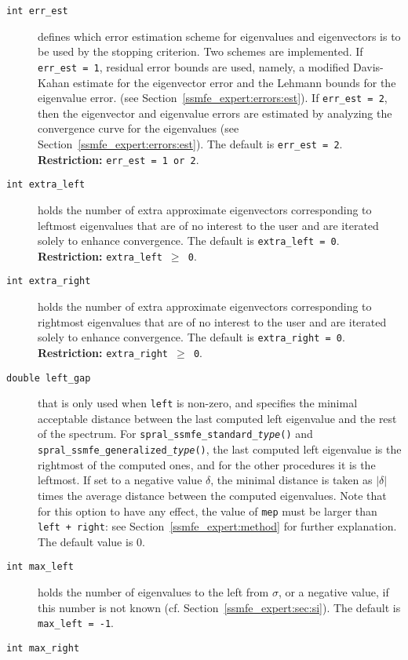 \begin{description}
%
\item[\texttt{int err\_est}] 
defines which error estimation scheme 
for eigenvalues and eigenvectors
is to be used by the stopping criterion.
Two schemes are implemented.
If {\tt err\_est = 1}, residual error bounds are used,
namely,
a modified Davis-Kahan estimate for the eigenvector error
and
the Lehmann bounds for the eigenvalue error.
(see Section~\ref{ssmfe_expert:errors:est}).
If {\tt err\_est = 2}, 
then the eigenvector and eigenvalue errors
are estimated by analyzing the convergence curve
for the eigenvalues (see Section~\ref{ssmfe_expert:errors:est}).
The default is {\tt err\_est = 2}.
{\bf Restriction:} {\tt err\_est = 1 {\rm or} 2}.
%
\item[\texttt{int extra\_left}]
holds the number of extra approximate eigenvectors
corresponding to leftmost eigenvalues
that are of no interest to the user
and are iterated solely to enhance convergence.
The default is {\tt extra\_left = 0}.
{\bf Restriction:} {\tt extra\_left $\ge$ 0}.
%
\item[\texttt{int extra\_right}]
holds the number of extra approximate eigenvectors
corresponding to rightmost eigenvalues
that are of no interest to the user
and are iterated solely to enhance convergence.
The default is {\tt extra\_right = 0}.
{\bf Restriction:} {\tt extra\_right $\ge$ 0}.
%
\item[\texttt{double left\_gap}]
that is only used when
{\tt left} is non-zero, and
specifies the minimal acceptable distance
between the last computed left eigenvalue
and the rest of the spectrum.
For {\tt spral\_ssmfe\_standard\_\textit{type}()} and {\tt spral\_ssmfe\_generalized\_\textit{type}()},
the last computed left eigenvalue
is the rightmost of the computed ones,
and for the other procedures
it is the leftmost.
If set to a negative value $\delta$,
the minimal distance is taken as
$|\delta|$ times the average distance between the computed eigenvalues.
Note that for this option to have any effect,
the value of {\tt mep} must be larger than
{\tt left + right}: see Section~\ref{ssmfe_expert:method}
for further explanation.
The default value is 0.
%
\item[\texttt{int max\_left}]
holds the number of eigenvalues to the left from $\sigma$,
or a negative value, if this number is not known
(cf. Section~\ref{ssmfe_expert:sec:si}).
The default is {\tt max\_left = -1}.
%
\item[\texttt{int max\_right}]

\end{description}
